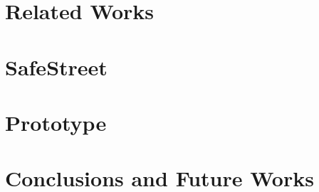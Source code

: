 \documentclass{sig-alternate}
\begin{document}
\section{Related Works}



\section{SafeStreet}
\label{solution}


\section{Prototype}
\label{solution}

\section{Conclusions and Future Works}




%

%
%
\end{document}
